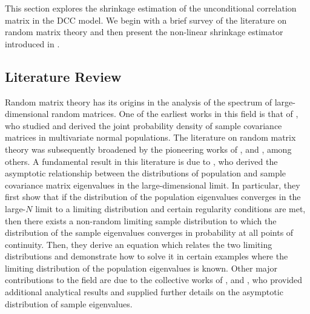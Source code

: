 This section explores the shrinkage estimation of the unconditional correlation matrix in the DCC model. We begin with a brief survey of the literature on random matrix theory and then present the non-linear shrinkage estimator introduced in \textcite{LEDOITWOLF2012}. 

\subsection{Literature Review}

Random matrix theory has its origins in the analysis of the spectrum of large-dimensional random matrices. One of the earliest works in this field is that of \textcite{WISHART1928}, who studied and derived the joint probability density of sample covariance matrices in multivariate normal populations. The literature on random matrix theory was subsequently broadened by the pioneering works of \textcite{DYSON1953}, \textcite{WIGNER1958} and \textcite{MP1967}, among others. A fundamental result in this literature is due to \textcite{MP1967}, who derived the asymptotic relationship between the distributions of population and sample covariance matrix eigenvalues in the large-dimensional limit. In particular, they first show that if the distribution of the population eigenvalues converges in the large-$N$ limit to a limiting distribution and certain regularity conditions are met, then there exists a non-random limiting sample distribution to which the distribution of the sample eigenvalues converges in probability at all points of continuity. Then, they derive an equation which relates the two limiting distributions and demonstrate how to solve it in certain examples where the limiting distribution of the population eigenvalues is known. Other major contributions to the field are due to the collective works of \textcite{SILVERSTEINBAI1995}, \textcite{SILVERSTEIN_CHOI_1995} and \textcite{SILVERSTEIN1995}, who provided additional analytical results and supplied further details on the asymptotic distribution of sample eigenvalues.

